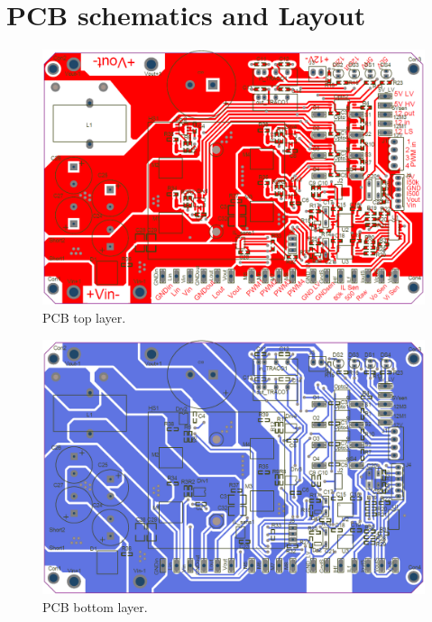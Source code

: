 \chapter{PCB schematics and Layout}\label{ch:AppPCB} 

\begin{figure}[H]
	\begin{center}
		\includegraphics[width=1\textwidth]{../Pictures/PCB_TopLayer}
		\caption{PCB top layer.}
		\label{PCB_TopLayer}
	\end{center}	
\end{figure}

\begin{figure}[H]
	\begin{center}
		\includegraphics[width=1\textwidth]{../Pictures/PCB_BottomLayer}
		\caption{PCB bottom layer.}
		\label{PCB_BottomLayer}
	\end{center}	
\end{figure}

